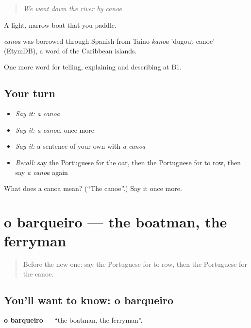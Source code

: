 \begin{quote}
\emph{We went down the river by canoe.}
\end{quote}

A light, narrow boat that you paddle.

\begin{cousinweb}
\emph{canoa} was borrowed through Spanish from Taíno \emph{kanoa} 'dugout canoe' (EtymDB), a word of the Caribbean islands.
\end{cousinweb}

\begin{grammarlens}[title={What you've built}]
One more word for telling, explaining and describing at B1.
\end{grammarlens}

\subsection*{Your turn}
\begin{itemize}
\raggedright
  \item \emph{Say it:} \emph{a canoa}
  \item \emph{Say it:} \emph{a canoa}, once more
  \item \emph{Say it:} a sentence of your own with \emph{a canoa}
  \item \emph{Recall:} say the Portuguese for the oar, then the Portuguese for to row, then say \emph{a canoa} again
\end{itemize}

\begin{tcolorbox}[breakable,colback=teal!4,colframe=teal!35!black,title={Before you move on}]
What does a canoa mean? (\textquotedblleft{}The canoe\textquotedblright{}.) Say it once more.
\end{tcolorbox}
\section[o barqueiro]{o barqueiro — the boatman, the ferryman}

\label{lesson:PT-C418-barqueiro}



\begin{quote}
Before the new one: say the Portuguese for to row, then the Portuguese for the canoe.
\end{quote}

\subsection*{You'll want to know: o barqueiro}
\textbf{o barqueiro} — \textquotedblleft{}the boatman, the ferryman\textquotedblright{}.

